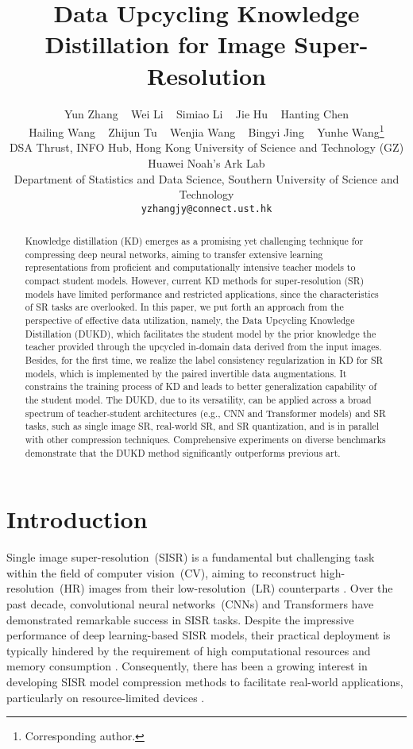 \documentclass[10pt,twocolumn,letterpaper]{article}
\title{Data Upcycling Knowledge Distillation for Image Super-Resolution}
\author{\hspace{-0.4cm}Yun Zhang ~ Wei Li  ~ Simiao Li ~ Jie Hu ~ Hanting Chen\\
	\hspace{-0.4cm}Hailing Wang ~ Zhijun Tu ~ Wenjia Wang ~ Bingyi Jing ~ Yunhe Wang\thanks{Corresponding author.}\\
	DSA Thrust, INFO Hub, Hong Kong University of Science and Technology (GZ)\\
	Huawei Noah's Ark Lab\\
	Department of Statistics and Data Science, Southern University of Science and Technology\\
	{\tt\hspace{-0.6cm}yzhangjy@connect.ust.hk}\quad\quad {\tt\{wei.lee, lisimiao\}@huawei.com}
}
\begin{document}
\maketitle

\begin{abstract}
\noindent Knowledge distillation (KD) emerges as a  promising yet challenging technique for compressing deep neural networks, aiming to transfer extensive learning representations from proficient and computationally intensive teacher models to compact student models.
However, current KD methods for super-resolution (SR) models have limited performance and restricted applications, since the characteristics of SR tasks are overlooked.
In this paper, we put forth an approach from the perspective of effective data utilization, namely, the Data Upcycling Knowledge Distillation (DUKD), which facilitates the student model by the prior knowledge the teacher provided through the upcycled in-domain data derived from the input images.
Besides, for the first time, we realize the label consistency regularization in KD for SR models, which is implemented by the paired invertible data augmentations. It constrains the training process of KD and leads to better generalization capability of  the student model.
The DUKD, due to its versatility, can be applied across a broad spectrum of teacher-student architectures (e.g., CNN and Transformer models) and SR tasks, such as single image SR, real-world SR, and SR quantization, and is in parallel with other compression techniques. 
Comprehensive experiments on diverse benchmarks demonstrate that the DUKD method significantly outperforms previous art.
\end{abstract} \section{Introduction}\label{sec: introduction}

Single image super-resolution~(SISR) is a fundamental but challenging task within the field of computer vision~(CV), aiming to reconstruct high-resolution~(HR) images from their low-resolution~(LR) counterparts \cite{lim2017enhanced, zhang2018image, liang2021swinir}. Over the past decade, convolutional neural networks~(CNNs) \cite{dong2015image, kim2016accurate,lim2017enhanced,zhang2018image} and Transformers \cite{liang2021swinir, yang2020learning, wang2022uformer,zamir2022restormer} have demonstrated remarkable success in SISR tasks. Despite the impressive performance of deep learning-based SISR models, their practical deployment is typically hindered by the requirement of high computational resources and memory consumption \cite{zhang2021aligned}. Consequently, there has been a growing interest in developing SISR model compression methods to facilitate real-world applications, particularly on resource-limited devices \cite{Huang_2023_CVPR}. 
\end{document}

